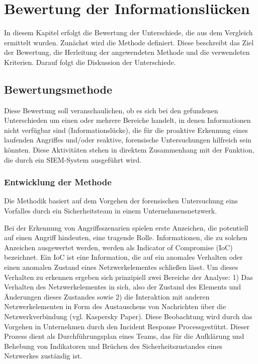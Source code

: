 \chapter{Bewertung der Informationslücken}
\label{cha:Bewertung der Informationslücken}
In diesem Kapitel erfolgt die Bewertung der Unterschiede, die aus dem Vergleich ermittelt wurden. Zunächst wird die Methode definiert. Diese beschreibt das Ziel der Bewertung, die Herleitung der angewendeten Methode und die verwendeten Kriterien. Darauf folgt die Diskussion der Unterschiede.

\section{Bewertungsmethode}
Diese Bewertung soll veranschaulichen, ob es sich bei den gefundenen Unterschieden um einen oder mehrere Bereiche handelt, in denen Informationen nicht verfügbar sind (\glqq Informationslücke\grqq ), die für die proaktive Erkennung eines laufenden Angriffes und/oder reaktive, forensische Untersuchungen hilfreich sein könnten. Diese Aktivitäten stehen in direktem Zusammenhang mit der Funktion, die durch ein SIEM-System ausgeführt wird.

\subsection{Entwicklung der Methode}
Die Methodik basiert auf dem Vorgehen der forensischen Untersuchung eins Vorfalles durch ein Sicherheitsteam in einem Unternehmensnetzwerk.

Bei der Erkennung von Angriffsszenarien spielen erste Anzeichen, die potentiell auf einen Angriff hindeuten, eine tragende Rolle. Informationen, die zu solchen Anzeichen ausgewertet werden, werden als \glqq Indicator of Compromise\grqq{}  (IoC) bezeichnet. Ein IoC ist eine Information, die auf ein anomales Verhalten oder einen anomalen Zustand eines Netzwerkelementes schließen lässt. Um dieses Verhalten zu erkennen ergeben sich prinzipiell zwei Bereiche der Analyse: 1) Das Verhalten des Netzwerkelementes in sich, also der Zustand des Elements und Änderungen dieses Zustandes sowie 2) die Interaktion mit anderen Netzwerkelementen in Form des Austauschens von Nachrichten über die Netzwerkverbindung (vgl. Kaspersky Paper).  
Diese Beobachtung wird durch das Vorgehen in Unternehmen durch den \glqq Incident Response Process\grqq gestützt. Dieser Prozess dient als Durchführungsplan eines Teams, das für die Aufklärung und Behebung von Indikatoren und Brüchen des Sicherheitszustandes eines Netzwerkes zuständig ist. 

